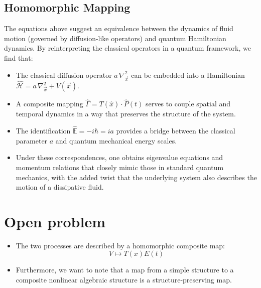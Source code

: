 \documentclass{article}
\begin{document}







\subsection{Homomorphic Mapping}
The equations above suggest an equivalence between the dynamics of fluid motion (governed by diffusion-like operators) and quantum Hamiltonian dynamics. By reinterpreting the classical operators in a quantum framework, we find that:
\begin{itemize}
    \item The classical diffusion operator $a\, \nabla_{\vec{x}}^2$ can be embedded into a Hamiltonian $\hat{\mathcal{H}} = a\, \nabla_{\vec{x}}^2 + V(\vec{x})$.
    \item A composite mapping $\hat{\Gamma} = T(\hat{x}) \cdot \hat{P}(t)$ serves to couple spatial and temporal dynamics in a way that preserves the structure of the system.
    \item The identification $\hat{\mathbb{E}} = -i\hbar = ia$ provides a bridge between the classical parameter $a$ and quantum mechanical energy scales.
    \item Under these correspondences, one obtains eigenvalue equations and momentum relations that closely mimic those in standard quantum mechanics, with the added twist that the underlying system also describes the motion of a dissipative fluid.
\end{itemize}

\section{Open problem}
\begin{itemize}
    \item The two processes are described by a homomorphic composite map:
    \[
    V \mapsto T(x) E(t)
    \]
    \item Furthermore, we want to note that a map from a simple structure to a composite nonlinear algebraic structure is a structure-preserving map.
\end{itemize} 

\noindent 
\end{document}
